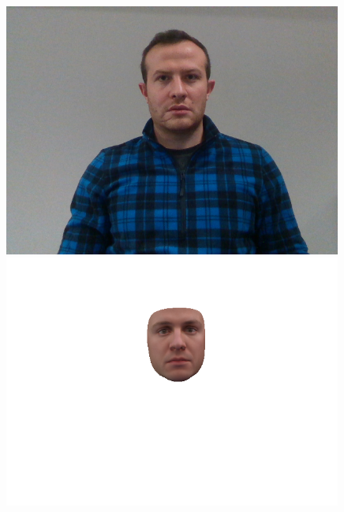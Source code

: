 \begin{figure}[h]
    \begin{minipage}{.325\textwidth}
      \centering
      \includegraphics[width=0.99\textwidth]{Figures/dataset/target/3.png}
    \end{minipage}
    \begin{minipage}{.325\textwidth}
      \centering
      \includegraphics[width=0.99\textwidth]{Figures/dataset/our/3.png}
    \end{minipage}
    \begin{minipage}{.325\textwidth}
      \centering

\end{minipage}
\end{figure}
